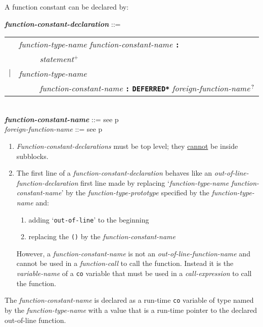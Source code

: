 \documentclass[12pt]{article}
\newcommand{\TT}[1]{{\tt \bfseries #1}}
\newcommand{\PLUS}[1][]{{$^{+#1}$}}
\newcommand{\QMARK}{{$^{\,\mbox{\footnotesize ?}}$}}
\newcommand{\emkey}[1]{{\em \bfseries #1}}
\newcommand{\pagref}[1]{p\pageref{#1}}
\newenvironment{indpar}[1][0.3in]%
	{\begin{list}{}%
		     {\setlength{\itemsep}{0in}%
		      \setlength{\topsep}{0in}%
		      \setlength{\parsep}{1ex}%
		      \setlength{\labelwidth}{#1}%
		      \setlength{\leftmargin}{#1}%
		      \addtolength{\leftmargin}{\labelsep}}%
	 \item}%
	{\end{list}}
\begin{document}
A function constant can be declared by:
\begin{indpar}
\emkey{function-constant-declaration}%
    \label{FUNCTION-CONSTANT-DECLARATION} ::= \\
\hspace*{0.5in}
    \begin{tabular}[t]{rl}
        &  {\em function-type-name} {\em function-constant-name} \TT{:} \\
	& \TT{~~~~~}{\em statement}\PLUS{} \\
    $|$ &  {\em function-type-name} \\
        &  \TT{~~~~~}{\em function-constant-name} \TT{:}
    	   \TT{*DEFERRED*} {\em foreign-function-name}\QMARK{} \\
    \end{tabular}
\\[0.5ex]
\emkey{function-constant-name} ::= see \pagref{FUNCTION-CONSTANT-NAME}
\\[0.5ex]
{\em foreign-function-name} ::= see \pagref{FOREIGN-FUNCTION-NAME}
\begin{enumerate}
\item
{\em Function-constant-declarations} must be top level; they
\underline{cannot} be inside subblocks.
\item
The first line of a {\em function-constant-declaration}
behaves like an {\em out-of-line-func\-tion-declaration}
first line made by replacing
`{\em function-type-name} {\em function-con\-stant-name}'
by the {\em function-type-prototype} specified by the
{\em function-type-name} and:
\begin{enumerate}
\item adding `{\tt out-of-line}' to the beginning
\item
replacing the {\tt ()} by the {\em function-constant-name}
\end{enumerate}
However, a {\em function-constant-name} is not an
{\em out-of-line-function-name} and cannot be used in a
{\em function-call} to call the function.  Instead it is the
{\em variable-name} of a {\tt co} variable
that must be used in a {\em call-expression} to call the function.
\end{enumerate}
\end{indpar}


The {\em function-constant-name} is declared as a run-time {\tt co}
variable of type named by the {\em function-type-name} with a
value that is a run-time pointer to the declared out-of-line function.
\end{document}
